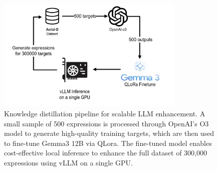 \begin{figure}[H]
\centering
\includegraphics[width=0.8\textwidth]{./Images/distillation.png}
\caption{Knowledge distillation pipeline for scalable LLM enhancement. A small sample of 500 expressions is processed through OpenAI's O3 model to generate high-quality training targets, which are then used to fine-tune Gemma3 12B via QLora. The fine-tuned model enables cost-effective local inference to enhance the full dataset of 300,000 expressions using vLLM on a single GPU.}
\label{fig:llm_distillation}
\end{figure}

